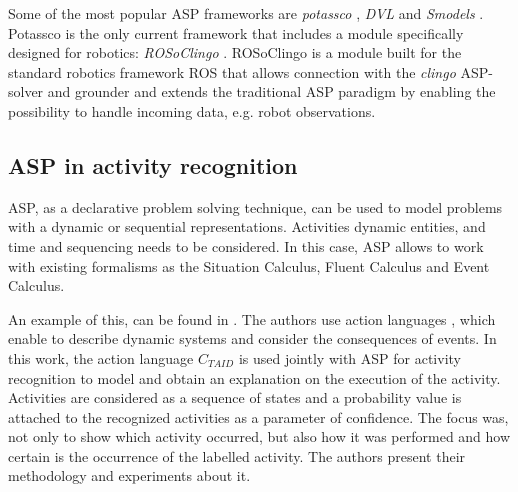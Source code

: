 Some of the most popular ASP frameworks are \textit{potassco} \citep{gekakaosscsc11a}, \textit{DVL} \citep{gekakaosscsc11a} and \textit{Smodels} \citep{Niemela2000_Smodels}.
Potassco is the only current framework that includes a module specifically designed for robotics: \textit{ROSoClingo} \citep{AndresOSSR13_rosoclingo}.
ROSoClingo is a module built for the standard robotics framework ROS \citep{Quigley09_ROS} that allows connection with the \textit{clingo} ASP-solver and grounder and extends the traditional ASP paradigm by enabling the possibility to handle incoming data, e.g. robot observations.



\subsection{ASP in activity recognition}
%
ASP, as a declarative problem solving technique, can be used to model problems with a dynamic or sequential representations. 
Activities dynamic entities, and time and sequencing needs to be considered.
In this case, ASP allows to work with existing formalisms as the Situation Calculus, Fluent Calculus and Event Calculus. 

An example of this, can be found in \citep{Partonia2015_MSc}.
The authors use action languages \citep{GelfondL98_AL}, which enable to describe dynamic systems and consider the consequences of events.
In this work, the action language $C_{TAID}$ is used jointly with ASP for activity recognition to model and obtain an explanation on the execution of the activity.
Activities are considered as a sequence of states and a probability value is attached to the recognized activities as a parameter of confidence.
The focus was, not only to show which activity occurred, but also how it was performed and how certain is the occurrence of the labelled activity.
The authors present their methodology and experiments about it.










